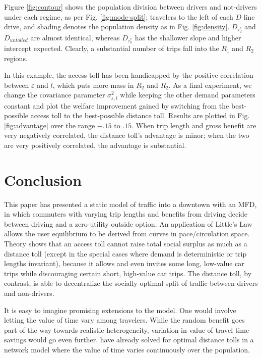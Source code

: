 \documentclass[preprint,authoryear]{elsarticle}
\newcommand{\taud}{\tau_d}
\newcommand{\taua}{\tau_a}
\newcommand{\ve}{\varepsilon}
\begin{document}
Figure \ref{fig:contour} shows the population division between drivers and not-drivers under each regime, as per Fig. \ref{fig:mode-split}; travelers to the left of each $D$ line drive, and shading denotes the population density as in Fig. \ref{fig:density}. $D_{\taud^*}$ and $D_{untolled}$ are almost identical, whereas $D_{\taua^*}$ has the shallower slope and higher intercept expected. Clearly, a substantial number of trips fall into the $R_1$ and $R_2$ regions.

In this example, the access toll has been handicapped by the positive correlation between $\ve$ and $l$, which puts more mass in $R_2$ and $R_2$. As a final experiment, we change the covariance parameter $\sigma_{\ve,l}^2$ while keeping the other demand parameters constant and plot the welfare improvement gained by switching from the best-possible access toll to the best-possible distance toll. Results are plotted in Fig. \ref{fig:advantage} over the range $-.15$ to $.15$. When trip length and gross benefit are very negatively correlated, the distance toll's advantage is minor; when the two are very positively correlated, the advantage is substantial.

\section{Conclusion}
\label{sec:conclusion}

This paper has presented a static model of traffic into a downtown with an MFD, in which commuters with varying trip lengths and benefits from driving decide between driving and a zero-utility outside option. An application of Little's Law allows the user equilibrium to be derived from curves in pace/circulation space. Theory shows that an access toll cannot raise total social surplus as much as a distance toll (except in the special cases where demand is deterministic or trip lengths invariant), because it allows and even invites some long, low-value car trips while discouraging certain short, high-value car trips. The distance toll, by contrast, is able to decentralize the socially-optimal split of traffic between drivers and non-drivers.

It is easy to imagine promising extensions to the model. One would involve letting the value of time vary among travelers. While the random benefit goes part of the way towards realistic heterogeneity, variation in value of travel time savings would go even further. \citet{Meng2012} have already solved for optimal distance tolls in a network model where the value of time varies continuously over the population.
\end{document}
